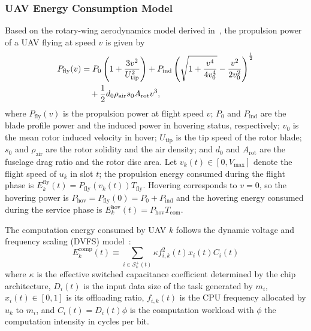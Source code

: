 \documentclass[journal]{IEEEtran}
\begin{document}
\subsubsection{UAV Energy Consumption Model}

Based on the rotary-wing aerodynamics model derived in~\cite{zeng2019energy}, the propulsion power of a UAV flying at speed $v$ is given by
\begin{align}\label{eq:flypower}
P_{\mathrm{fly}}(v) &= P_0\left(1 + \frac{3v^2}{U_{\mathrm{tip}}^2}\right)
+ P_{\mathrm{ind}}\left(\sqrt{1 + \frac{v^4}{4v_0^4}} - \frac{v^2}{2v_0^2}\right)^{\frac{1}{2}} \notag \\
&\quad + \frac{1}{2} d_0 \rho_{\mathrm{air}} s_0 A_{\mathrm{rot}} v^3,
\end{align}
where $P_{\mathrm{fly}}(v)$ is the propulsion power at flight speed $v$;
$P_0$ and $P_{\mathrm{ind}}$ are the blade profile power and the induced power
in hovering status, respectively; $v_0$ is the mean rotor induced velocity in
hover; $U_{\mathrm{tip}}$ is the tip speed of the rotor blade; $s_0$ and
$\rho_{\mathrm{air}}$ are the rotor solidity and the air density; and $d_0$ and
$A_{\mathrm{rot}}$ are the fuselage drag ratio and the rotor disc area.
Let $v_k(t)\in[0,V_{\max}]$ denote the flight speed of $u_k$ in slot $t$; the
propulsion energy consumed during the flight phase is
$E^{\mathrm{fly}}_k(t)=P_{\mathrm{fly}}(v_k(t))T_{\mathrm{fly}}$. Hovering
corresponds to $v=0$, so the hovering power is
$P_{\mathrm{hov}}=P_{\mathrm{fly}}(0)=P_0+P_{\mathrm{ind}}$ and the hovering
energy consumed during the service phase is
$E^{\mathrm{hov}}_k(t)=P_{\mathrm{hov}}T_{\mathrm{com}}$.



The computation energy consumed by UAV $k$ follows the dynamic voltage and frequency scaling (DVFS) model~\cite{burd2000processor_dvfs}:
\begin{equation}\label{eq:compenergy}
E_{k}^{\mathrm{comp}}(t) \equiv \sum_{i\in \mathcal{S}_{k}^{+}(t)} \kappa f_{i,k}^{2}(t) x_{i}(t) C_{i}(t)
\end{equation}
where $\kappa$ is the effective switched capacitance coefficient determined by
the chip architecture, $D_i(t)$ is the input data size of the task
generated by $m_i$, $x_i(t)\in[0,1]$ is its offloading ratio, $f_{i,k}(t)$ is
the CPU frequency allocated by $u_k$ to $m_i$, and $C_i(t)=D_i(t)\phi$ is the
computation workload with $\phi$ the computation intensity in cycles per bit.
\end{document}
